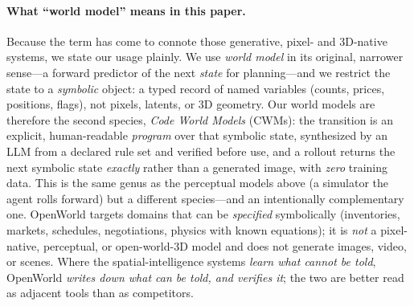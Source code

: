 \documentclass[11pt]{article}
\begin{document}
\paragraph{What ``world model'' means in this paper.} Because the term has come to
connote those generative, pixel- and 3D-native systems, we state our usage plainly.
We use \emph{world model} in its original, narrower sense---a forward predictor of
the next \emph{state} for planning---and we restrict the state to a \emph{symbolic}
object: a typed record of named variables (counts, prices, positions, flags), not
pixels, latents, or 3D geometry. Our world models are therefore the second species,
\emph{Code World Models} (CWMs): the transition is an explicit, human-readable
\emph{program} over that symbolic state, synthesized by an LLM from a declared rule
set and verified before use, and a rollout returns the next symbolic state
\emph{exactly} rather than a generated image, with \emph{zero} training data. This
is the same genus as the perceptual models above (a simulator the agent rolls
forward) but a different species---and an intentionally complementary one.
OpenWorld targets domains that can be \emph{specified} symbolically (inventories,
markets, schedules, negotiations, physics with known equations); it is \emph{not} a
pixel-native, perceptual, or open-world-3D model and does not generate images,
video, or scenes. Where the spatial-intelligence systems \emph{learn what cannot be
told}, OpenWorld \emph{writes down what can be told, and verifies it}; the two are
better read as adjacent tools than as competitors.
\end{document}
